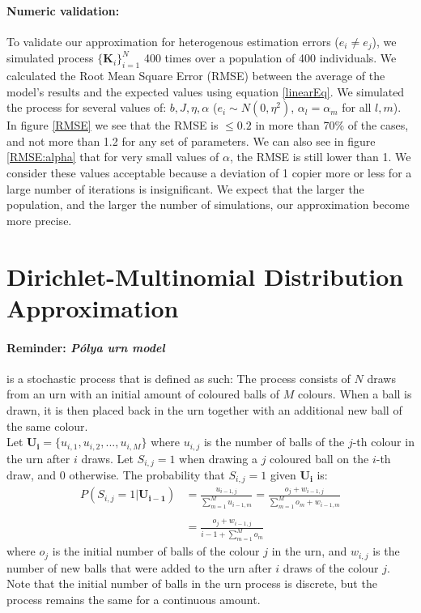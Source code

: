 \documentclass[11pt]{article}
\let\vec\mathbf
\begin{document}
\paragraph{Numeric validation:} To validate our approximation for heterogenous estimation errors ($e_i \ne e_j$), we simulated process $\big\{\vec{K}_i\big\}_{i=1}^N$ 400 times over a population of 400 individuals.
We calculated the Root Mean Square Error (RMSE) between the average of the model's results and the expected values using equation \ref{linearEq}.
 We simulated the process for several values of: $b,J,\eta,\alpha$ ($e_i \sim N(0,\eta^2)$, $\alpha_l=\alpha_m$ for all $l,m$).
 In figure \ref{RMSE} we see that the RMSE is $\le 0.2$ in more than 70\% of the cases, and not more than 1.2 for any set of parameters.
 We can also see in figure \ref{RMSE:alpha} that for very small values of $\alpha$, the RMSE is still lower than 1. 
We consider these values acceptable because a deviation of 1 copier more or less for a large number of iterations is insignificant. 
We expect that the larger the population, and the larger the number of simulations, our approximation become more precise.
\clearpage

\section*{Dirichlet-Multinomial Distribution Approximation}
\paragraph{Reminder: \textit{Pólya urn model}}  is a stochastic process that is defined as such: 
The process consists of $N$ draws from an urn with an initial amount of coloured balls of $M$ colours. When a ball is drawn, it is then placed back in the urn together with an additional new ball of the same colour.\\
Let $\vec{U_i} = \{u_{i,1},u_{i,2},...,u_{i,M}\}$  where $u_{i,j}$ is the number of balls of the $j$-th colour in the urn after $i$ draws.
Let $S_{i,j}=1$ when drawing a $j$ coloured ball on the $i$-th draw, and $0$ otherwise. The probability that $S_{i,j}=1$ given $\vec{U_i}$ is:
\begin{equation}\label{polya}
\begin{split}
P(S_{i,j} = 1 | \vec{U_{i-1}}) & = \frac{u_{i-1,j}}{\sum\limits_{m=1}^{M} u_{i-1,m}} = \frac{o_j + w_{i-1,j}}{\sum\limits_{m=1}^{M} o_m + w_{i-1,m}}\\\\
 & = \frac{o_j + w_{i-1,j}}{i-1 + \sum\limits_{m=1}^{M} o_m}
\end{split}
\end{equation}
where $o_j$ is the initial number of balls of the colour $j$ in the urn, and $w_{i,j}$ is the number of new balls that were added to the urn after $i$ draws of the colour $j$.
Note that the initial number of balls in the urn process is discrete, but the process remains the same for a continuous amount.
\end{document}

